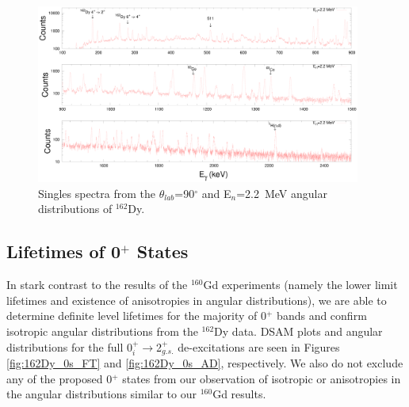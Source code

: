 \begin{figure}[h!]
\begin{center}
\includegraphics[width=0.95\textwidth]{figures/sample_spec_stacked_220.eps}
\caption{Singles spectra from the $\theta_{lab}$=90$^\circ$ and E$_n$=2.2~MeV angular distributions of $^{162}$Dy. \label{fig:162Dy_220_spectrum}}
\end{center}
\end{figure}

\subsection{Lifetimes of 0$^+$ States}
In stark contrast to the results of the $^{160}$Gd experiments (namely the lower limit lifetimes and existence of anisotropies in angular distributions), we are able to determine definite level lifetimes for the majority of 0$^+$ bands and confirm isotropic angular distributions from the $^{162}$Dy data. DSAM plots and angular distributions for the full 0$^+_i\rightarrow$2$^+_{g.s.}$ de-excitations are seen in Figures \ref{fig:162Dy_0s_FT} and \ref{fig:162Dy_0s_AD}, respectively. We also do not exclude any of the proposed 0$^+$ states from our observation of isotropic or anisotropies in the angular distributions similar to our $^{160}$Gd results.

